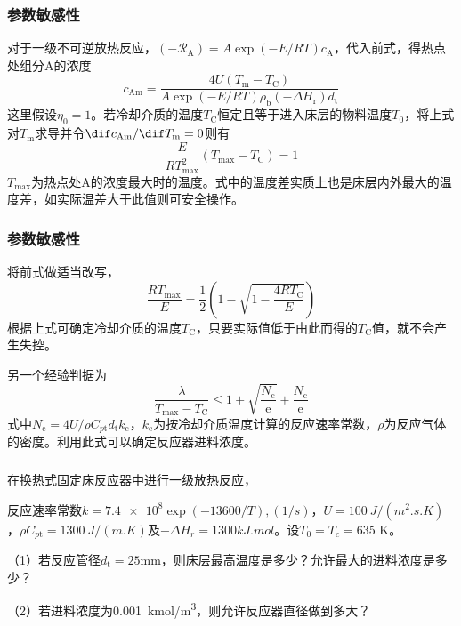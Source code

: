 \begin{frame}
    \frametitle{参数敏感性}

    对于一级不可逆放热反应，$(-\mathscr{R}_{\mathrm{A}})=A \exp (-E / R T) c_{\mathrm{A}}$，代入前式，得热点处组分A的浓度
    \[
        c_{\mathrm{Am}}=\frac{4 U(T_{\mathrm{m}}-T_{\mathrm{C}})}{A \exp (-E / R T) \rho_{\mathrm{b}}(-\Delta H_{\mathrm{r}}) d_{\mathrm{t}}}
    \]
    这里假设$\eta_0 =1$。若冷却介质的温度$T_{\mathrm{C}}$恒定且等于进入床层的物料温度$T_0$，将上式对$T_{\mathrm{m}}$求导并令$\dif c_{\mathrm{Am}}/\dif T_{\mathrm{m}} =0$则有
    \[
        \frac{E}{R T_{\max }^2}(T_{\max } - T_{\mathrm{C}}) = 1
    \]
    $T_{\max }$为热点处A的浓度最大时的温度。式中的温度差实质上也是床层内外最大的温度差，如实际温差大于此值则可安全操作。
    

\end{frame}


\begin{frame}
    \frametitle{参数敏感性}

    将前式做适当改写，
    \[
        \frac{R T_{\max }}{E}=\frac{1}{2}\left(1-\sqrt{1-\frac{4 R T_{\mathrm{C}}}{E}}\right)
    \]
    根据上式可确定冷却介质的温度$T_{\mathrm{C}}$，只要实际值低于由此而得的$T_{\mathrm{C}}$值，就不会产生失控。

    另一个经验判据为
    \[
        \frac{\lambda}{T_{\max }-T_{\mathrm{C}}} \leqslant 1+\sqrt{\frac{N_{\mathrm{c}}}{\mathrm{e}}}+\frac{N_{\mathrm{c}}}{\mathrm{e}}
    \]
    式中$N_{\mathrm{c}} = 4U/\rho C_{p \mathrm{t}} d_{\mathrm{t}} k_{\mathrm{c}}$，$k_{\mathrm{c}}$为按冷却介质温度计算的反应速率常数，$\rho$为反应气体的密度。利用此式可以确定反应器进料浓度。

\end{frame}


\begin{frame}[t]
    \frametitle{}

    \begin{example}
        在换热式固定床反应器中进行一级放热反应，
        
        反应速率常数$k=\num{7.4e8}\exp (-13600/T),(1/s)$，$U = \SI{100}{J/(m^2.s.K)}$，$\rho C_{p \mathrm{t}}=\SI{1300}{J/(m.K)}$及$-\Delta H_r = 1300 \si{kJ.mol}$。设$T_0=T_c=$635 K。

        （1）若反应管径$d_\mathrm{t}=25$mm，则床层最高温度是多少？允许最大的进料浓度是多少？

        （2）若进料浓度为\SI{0.001}{kmol/m^3}，则允许反应器直径做到多大？
    \end{example}

\end{frame}

